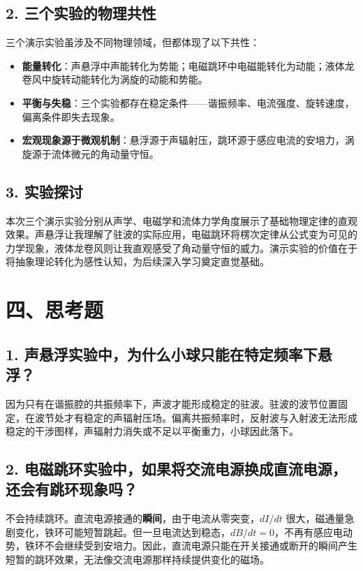 \documentclass[a4paper,12pt]{article}
\begin{document}
\subsection{2. 三个实验的物理共性}

三个演示实验虽涉及不同物理领域，但都体现了以下共性：
\begin{itemize}[nosep]
    \item \textbf{能量转化}：声悬浮中声能转化为势能；电磁跳环中电磁能转化为动能；液体龙卷风中旋转动能转化为涡旋的动能和势能。
    \item \textbf{平衡与失稳}：三个实验都存在稳定条件——谐振频率、电流强度、旋转速度，偏离条件即失去现象。
    \item \textbf{宏观现象源于微观机制}：悬浮源于声辐射压，跳环源于感应电流的安培力，涡旋源于流体微元的角动量守恒。
\end{itemize}

\subsection{3. 实验探讨}

本次三个演示实验分别从声学、电磁学和流体力学角度展示了基础物理定律的直观效果。声悬浮让我理解了驻波的实际应用，电磁跳环将楞次定律从公式变为可见的力学现象，液体龙卷风则让我直观感受了角动量守恒的威力。演示实验的价值在于将抽象理论转化为感性认知，为后续深入学习奠定直觉基础。

\newpage

\section{四、思考题}

\subsection{1. 声悬浮实验中，为什么小球只能在特定频率下悬浮？}

因为只有在谐振腔的共振频率下，声波才能形成稳定的驻波。驻波的波节位置固定，在波节处才有稳定的声辐射压场。偏离共振频率时，反射波与入射波无法形成稳定的干涉图样，声辐射力消失或不足以平衡重力，小球因此落下。

\subsection{2. 电磁跳环实验中，如果将交流电源换成直流电源，还会有跳环现象吗？}

不会持续跳环。直流电源接通的\textbf{瞬间}，由于电流从零突变，$dI/dt$ 很大，磁通量急剧变化，铁环可能短暂跳起。但一旦电流达到稳态，$dB/dt = 0$，不再有感应电动势，铁环不会继续受到安培力。因此，直流电源只能在开关接通或断开的瞬间产生短暂的跳环效果，无法像交流电源那样持续提供变化的磁场。
\end{document}
